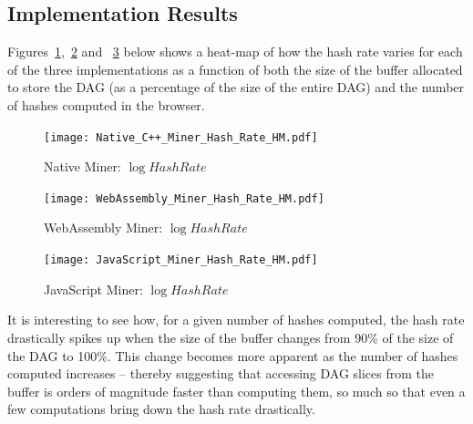 \documentclass[runningheads]{llncs}
\newcommand{\trishita}[1]{{\color{magenta}\bfseries[Trishita: #1]}}
\begin{document}

\subsection{Implementation Results}
Figures~\ref{fig:NativeMinerHM},~\ref{fig:WebAsmMinerHM} and ~\ref{fig:JSMinerHM} below shows a heat-map of how the hash rate varies for each of the three implementations as a function of both the size of the buffer allocated to store the DAG (as a percentage of the size of the entire DAG) and the number of hashes computed in the browser. 

\begin{figure}[h]
\centering
\texttt{[image: Native\_C++\_Miner\_Hash\_Rate\_HM.pdf]}
\caption{\label{fig:NativeMinerHM} Native Miner: $\log{Hash Rate}$}
\end{figure}

\begin{figure}[h]
\centering
\texttt{[image: WebAssembly\_Miner\_Hash\_Rate\_HM.pdf]}
\caption{\label{fig:WebAsmMinerHM} WebAssembly Miner: $\log{Hash Rate}$}
\end{figure}

\begin{figure}[h]
\centering
\texttt{[image: JavaScript\_Miner\_Hash\_Rate\_HM.pdf]}
\caption{\label{fig:JSMinerHM} JavaScript Miner: $\log{Hash Rate}$}
\end{figure}


It is interesting to see how, for a given number of hashes computed, the hash rate drastically spikes up when the size of the buffer changes from 90\% of the size of the DAG to 100\%. This change becomes more apparent as the number of hashes computed increases -- thereby suggesting that accessing DAG slices from the buffer is orders of magnitude faster than computing them, so much so that even a few computations bring down the hash rate drastically. 
\end{document}
